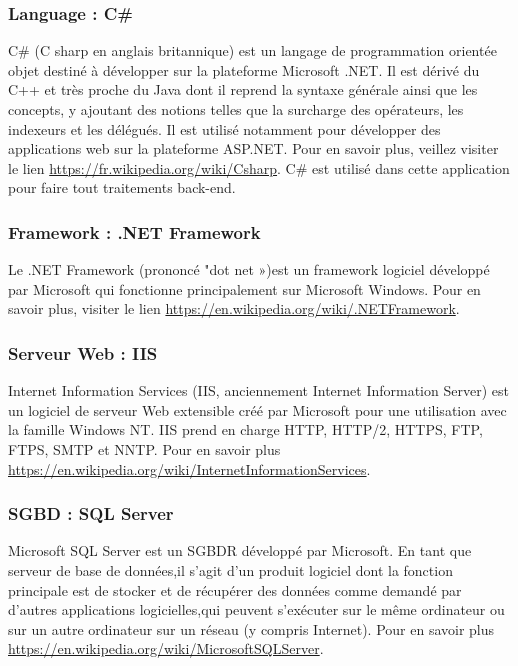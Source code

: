 \subsubsection{Language : C\#}
C\# (C sharp en anglais britannique) est un langage de programmation orientée objet destiné à développer sur la plateforme Microsoft .NET. Il est dérivé du C++ et très proche du Java dont il reprend la syntaxe générale ainsi que les concepts, y ajoutant des notions telles que la surcharge des opérateurs, les indexeurs et les délégués. Il est utilisé notamment pour développer des applications web sur la plateforme ASP.NET. Pour en savoir plus, veillez visiter le lien \href{https://fr.wikipedia.org/wiki/C_sharp}{https://fr.wikipedia.org/wiki/Csharp}. \newline
C\# est utilisé dans cette application pour faire tout traitements back-end.

\subsubsection{Framework : .NET Framework}
Le .NET Framework (prononcé "dot net »)est un framework logiciel développé par Microsoft qui fonctionne principalement sur Microsoft Windows. Pour en savoir plus, visiter le lien \newline \href{https://en.wikipedia.org/wiki/.NET_Framework}{https://en.wikipedia.org/wiki/.NETFramework}.

\subsubsection{Serveur Web : IIS}
Internet Information Services (IIS, anciennement Internet Information Server) est un logiciel de serveur Web extensible créé par Microsoft pour une utilisation avec la famille Windows NT. IIS prend en charge \gls{HTTP}, HTTP/2, \gls{HTTPS}, FTP, FTPS, SMTP et NNTP. \newline
Pour en savoir plus \href{https://en.wikipedia.org/wiki/Internet_Information_Services}{https://en.wikipedia.org/wiki/InternetInformationServices}.

\subsubsection{\gls{SGBD} : SQL Server}
Microsoft SQL Server est un \gls{SGBDR} développé par Microsoft. En tant que serveur de base de données,il s’agit d’un produit logiciel dont la fonction principale est de stocker et de récupérer des données comme demandé par d’autres applications logicielles,qui peuvent s’exécuter sur le même ordinateur ou sur un autre ordinateur sur un réseau (y compris Internet). Pour en savoir plus \href{https://en.wikipedia.org/wiki/Microsoft_SQL_Server}{https://en.wikipedia.org/wiki/MicrosoftSQLServer}.

